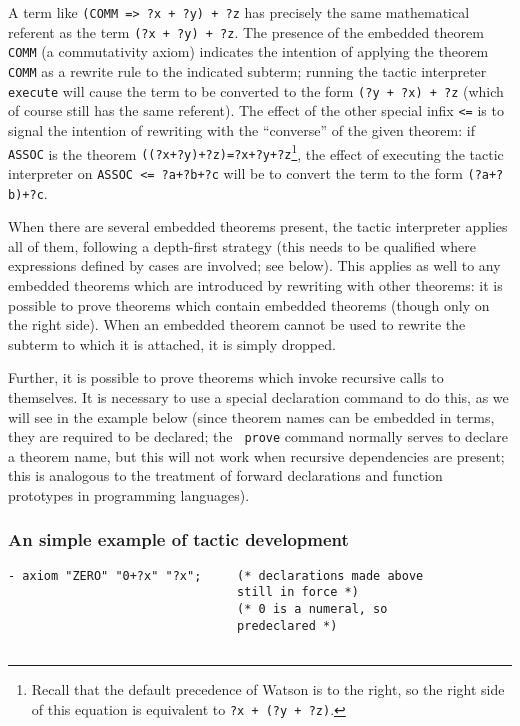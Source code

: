 \documentclass{kluwer}
\begin{document}
\begin{article}
A term like {\tt (COMM => ?x + ?y) + ?z} has precisely the same
mathematical referent as the term {\tt (?x + ?y) + ?z}.  The presence
of the embedded theorem {\tt COMM} (a commutativity axiom) indicates
the intention of applying the theorem {\tt COMM} as a rewrite rule to
the indicated subterm; running the tactic interpreter {\tt execute}
will cause the term to be converted to the form {\tt (?y + ?x) + ?z}
(which of course still has the same referent).  The effect of the
other special infix {\tt <=} is to signal the intention of rewriting
with the ``converse'' of the given theorem: if {\tt ASSOC} is the
theorem {\tt ((?x+?y)+?z)=?x+?y+?z}\footnote{Recall that the default
precedence of Watson is to the right, so the right side of this
equation is equivalent to {\tt ?x + (?y + ?z)}.}, the effect of
executing the tactic interpreter on {\tt ASSOC <= ?a+?b+?c} will be to
convert the term to the form {\tt (?a+?b)+?c}.

When there are several embedded theorems present, the tactic
interpreter applies all of them, following a depth-first strategy
(this needs to be qualified where expressions defined by cases are
involved; see below).  This applies as well to any embedded theorems
which are introduced by rewriting with other theorems: it is possible
to prove theorems which contain embedded theorems (though only on the
right side).  When an embedded theorem cannot be used to rewrite the
subterm to which it is attached, it is simply dropped.

Further, it is possible to prove theorems which invoke recursive calls
to themselves.  It is necessary to use a special declaration command
to do this, as we will see in the example below (since theorem names
can be embedded in terms, they are required to be declared; the {\tt
prove} command normally serves to declare a theorem name, but this
will not work when recursive dependencies are present; this is
analogous to the treatment of forward declarations and function
prototypes in programming languages).

\subsubsection{An simple example of tactic development}

\begin{verbatim}
- axiom "ZERO" "0+?x" "?x";     (* declarations made above 
                                still in force *)
                                (* 0 is a numeral, so 
                                predeclared *)


\end{verbatim}
\end{article}
\end{document}
